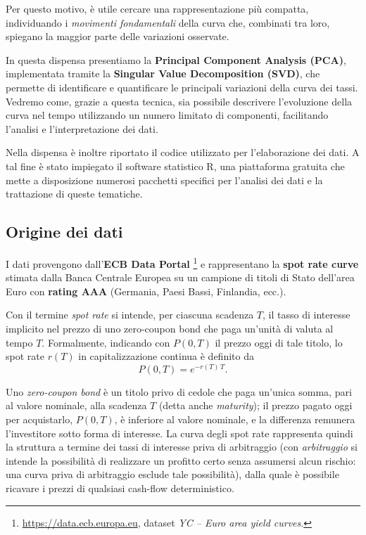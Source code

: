 \documentclass[11pt,a4paper]{article}
\theoremstyle{plain}
\theoremstyle{definition}
\theoremstyle{remark}
\begin{document}
Per questo motivo, è utile cercare una rappresentazione più compatta, individuando i \emph{movimenti fondamentali} della curva che, combinati tra loro, spiegano la maggior parte delle variazioni osservate. 

In questa dispensa presentiamo la \textbf{Principal Component Analysis (PCA)}, implementata tramite la \textbf{Singular Value Decomposition (SVD)}, che permette di identificare e quantificare le principali variazioni della curva dei tassi. Vedremo come, grazie a questa tecnica, sia possibile descrivere l'evoluzione della curva nel tempo utilizzando un numero limitato di componenti, facilitando l'analisi e l'interpretazione dei dati.

Nella dispensa è inoltre riportato il codice utilizzato per l'elaborazione dei dati. A tal fine è stato impiegato il software statistico R, una piattaforma gratuita che mette a disposizione numerosi pacchetti specifici per l'analisi dei dati e la trattazione di queste tematiche.


\subsection{Origine dei dati}
\label{sec:origine-dati}

I dati provengono dall'\textbf{ECB Data Portal}%
\footnote{\url{https://data.ecb.europa.eu}, dataset \emph{YC -- Euro area yield curves}.}
e rappresentano la \textbf{spot rate curve} stimata dalla Banca Centrale Europea
su un campione di titoli di Stato dell'area Euro con \textbf{rating AAA}
(Germania, Paesi Bassi, Finlandia, ecc.). 

Con il termine \emph{spot rate} si intende, per ciascuna scadenza $T$, il tasso
di interesse implicito nel prezzo di uno zero-coupon bond che paga un'unità di
valuta al tempo $T$. Formalmente, indicando con $P(0,T)$ il prezzo oggi di tale
titolo, lo spot rate $r(T)$ in capitalizzazione continua è definito da
\[
P(0,T) = e^{-r(T) \, T}.
\]

Uno \emph{zero-coupon bond} è un titolo privo di cedole che paga un'unica somma,
pari al valore nominale, alla scadenza $T$ (detta anche \emph{maturity}); il
prezzo pagato oggi per acquistarlo, $P(0,T)$, è inferiore al valore nominale, e la
differenza remunera l'investitore sotto forma di interesse.
La curva degli spot rate rappresenta quindi la struttura a termine dei tassi
di interesse priva di arbitraggio (con \emph{arbitraggio} si intende la
possibilità di realizzare un profitto certo senza assumersi alcun rischio: una
curva priva di arbitraggio esclude tale possibilità), dalla quale è possibile
ricavare i prezzi di qualsiasi cash-flow deterministico.
\end{document}
